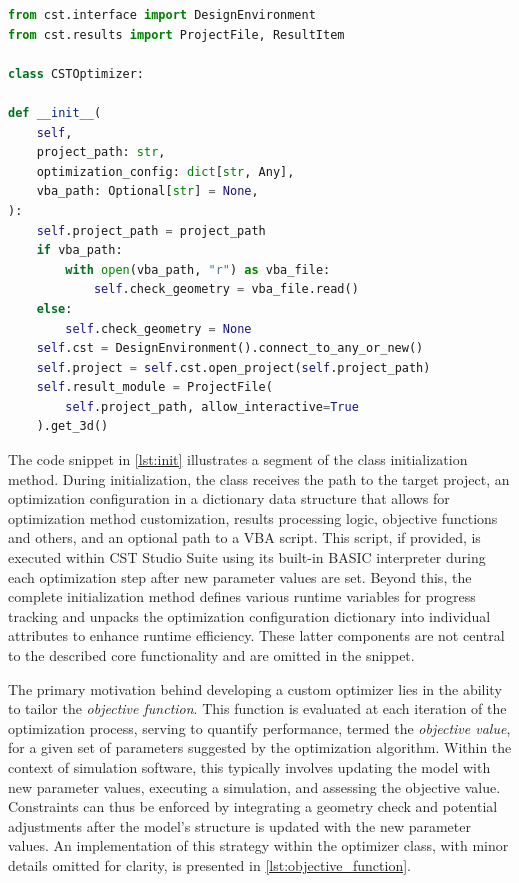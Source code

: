 \documentclass[11pt,a4paper,twoside,openany]{report}
\begin{document}
\begin{lstlisting}[caption={Optimizer class initialization}, label={lst:init}, language=Python]
from cst.interface import DesignEnvironment
from cst.results import ProjectFile, ResultItem

class CSTOptimizer:

def __init__(
    self,
    project_path: str,
    optimization_config: dict[str, Any],
    vba_path: Optional[str] = None,
):
    self.project_path = project_path
    if vba_path:
        with open(vba_path, "r") as vba_file:
            self.check_geometry = vba_file.read()
    else:
        self.check_geometry = None
    self.cst = DesignEnvironment().connect_to_any_or_new()
    self.project = self.cst.open_project(self.project_path)
    self.result_module = ProjectFile(
        self.project_path, allow_interactive=True
    ).get_3d()
\end{lstlisting}

The code snippet in \cref{lst:init} illustrates a segment of the class initialization method. During initialization, the class receives the path to the target project, an optimization configuration in a dictionary data structure that allows for optimization method customization, results processing logic, objective functions and others, and an optional path to a VBA script. This script, if provided, is executed within CST Studio Suite using its built-in BASIC interpreter during each optimization step after new parameter values are set. Beyond this, the complete initialization method defines various runtime variables for progress tracking and unpacks the optimization configuration dictionary into individual attributes to enhance runtime efficiency. These latter components are not central to the described core functionality and are omitted in the snippet.

The primary motivation behind developing a custom optimizer lies in the ability to tailor the \emph{objective function}. This function is evaluated at each iteration of the optimization process, serving to quantify performance, termed the \emph{objective value}, for a given set of parameters suggested by the optimization algorithm. Within the context of simulation software, this typically involves updating the model with new parameter values, executing a simulation, and assessing the objective value. Constraints can thus be enforced by integrating a geometry check and potential adjustments after the model's structure is updated with the new parameter values. An implementation of this strategy within the optimizer class, with minor details omitted for clarity, is presented in \cref{lst:objective_function}.
\end{document}
